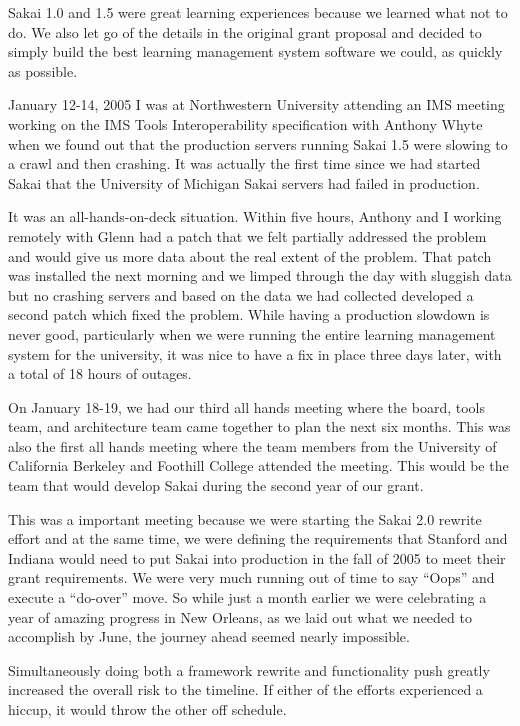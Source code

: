 \documentclass[12pt]{book}
\begin{document}
Sakai 1.0 and 1.5 were great learning experiences because
we learned what not to do.  We also let go of the details
in the original grant proposal and decided to simply build
the best learning management system software we could,
as quickly as possible.

January 12-14, 2005 I was at Northwestern University attending
an IMS meeting working on the IMS Tools Interoperability
specification with Anthony Whyte when we found out
that the production servers
running Sakai 1.5 were slowing to a crawl and then crashing.
It was actually the first time since we had started Sakai
that the University of Michigan Sakai servers had failed
in production.

It was an all-hands-on-deck situation.  Within five hours,
Anthony and I working remotely with Glenn had a patch that we felt
partially addressed the problem and would give us more data
about the real extent of the problem.  That patch was
installed the next morning and we limped through the day
with sluggish data but no crashing servers and based on
the data we had collected developed a second patch which
fixed the problem.  While having a production
slowdown is never good, particularly when we were running
the entire learning management system for the university,
it was nice to have a fix in place three days later, with
a total of 18 hours of outages.

On January 18-19, we had our third all hands meeting where
the board, tools team, and architecture team came together
to plan the next six months.  This was also the first
all hands meeting where the team members from the
University of California Berkeley and Foothill College
attended the meeting.  This would be the team that would
develop Sakai during the second year of our grant.

This was a important
meeting because we were starting the Sakai 2.0
rewrite effort and at the same time, we were defining the
requirements that Stanford and Indiana would need to put
Sakai into production in the fall of 2005 to meet their
grant requirements.  We were very much running out of
time to say ``Oops'' and execute a ``do-over'' move.
So while just a month earlier we were
celebrating a year of amazing progress in New Orleans,
as we laid out what we needed to accomplish by June,
the journey ahead seemed nearly impossible.

Simultaneously doing both a framework rewrite and
functionality push greatly increased the overall
risk to the timeline.  If either of the efforts
experienced a hiccup, it would throw the other off
schedule.
\end{document}
